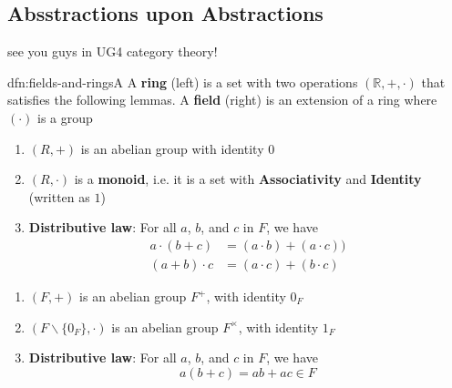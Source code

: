 \documentclass[landscape, 8pt]{extarticle}
\begin{document}
\setlength{\abovedisplayskip}{3.5pt}
\setlength{\belowdisplayskip}{3.5pt}
\setlength{\abovedisplayshortskip}{3.5pt}
\setlength{\belowdisplayshortskip}{3.5pt}

\begin{multicols}{3}
\raggedcolumns

\section{Absstractions upon Abstractions}
see you guys in UG4 category theory!

\begin{dfn}{dfn:fields-and-rings}{A}
    A \textbf{ring} (left) is a set with two operations $(\mathbb{R}, +, \cdot)$ that satisfies the following lemmas.\newline
    A \textbf{field} (right) is an extension of a ring where $(\cdot)$ is a group 
    \vspace{-15pt}
    \def\columnseprulecolor{\color{black}}
    \setlength{\columnseprule}{0.5pt}
    \begin{multicols}{2}

        \begin{enumerate}[leftmargin=*]
            \setlength\itemsep{0em}
            \item $(R, +)$ is an abelian group with identity $0$
            \item $(R, \cdot)$ is a \textbf{monoid}, i.e. it is a set with \textbf{Associativity} and \textbf{Identity} (written as $1$)
            \item \textbf{Distributive law}: For all $a$, $b$, and $c$ in $F$, we have
                \begin{align*}
                    a \cdot (b + c) &= (a \cdot b) + (a \cdot c)) \\
                    (a + b) \cdot c &= (a \cdot c) + (b \cdot c)
                \end{align*}
        \end{enumerate}
        \columnbreak

        \begin{enumerate}[leftmargin=*]
            \setlength\itemsep{0em}
            \item $(F, +)$ is an abelian group $F^{+}$, with identity $0_{F}$
            \item $(F\backslash \{0_{F}\}, \cdot)$ is an abelian group $F^{\times}$, with identity $1_{F}$
            \item \textbf{Distributive law}: For all $a$, $b$, and $c$ in $F$, we have
                \[a(b + c) = ab + ac \in F\]
        \end{enumerate}
    \end{multicols}


\end{dfn}
\end{multicols}
\end{document}
